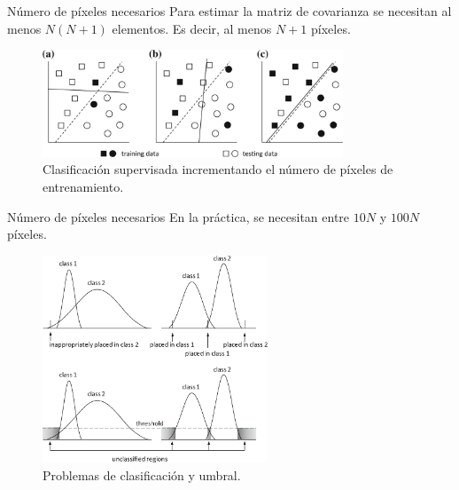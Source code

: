 \documentclass[]{beamer}
\begin{document}
\begin{frame}{\subsecname}
  \begin{block}{Número de píxeles necesarios}
    Para estimar la matriz de covarianza se necesitan al menos $N(N+1)$ elementos. Es decir, al menos $N+1$ píxeles.
  \end{block}
\end{frame}

\begin{frame}{\subsecname}
  \begin{figure}
  \includegraphics[width=0.8\textwidth]{imagenes/train.png}
  \caption{Clasificación supervisada incrementando el número de píxeles de entrenamiento.}
  \end{figure}
\end{frame}

\begin{frame}{\subsecname}
  \begin{alertblock}{Número de píxeles necesarios}
    En la práctica, se necesitan entre $10N$ y $100N$ píxeles.
  \end{alertblock}
\end{frame}

\begin{frame}{\subsecname}
  \begin{figure}
  \includegraphics[width=0.6\textwidth]{imagenes/thresh.png}
  \caption{Problemas de clasificación y umbral.}
  \end{figure}
\end{frame}
\end{document}
